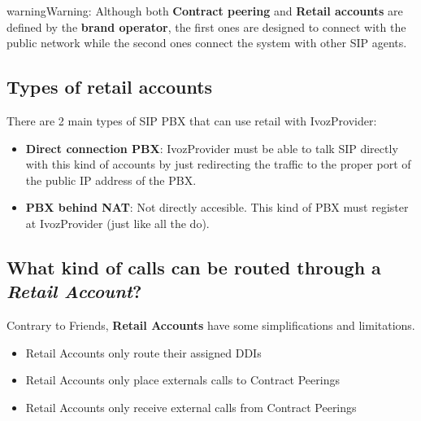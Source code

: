 \documentclass[letterpaper,10pt,english]{sphinxmanual}
\begin{document}
\begin{notice}{warning}{Warning:}
Although both \textbf{Contract peering} and \textbf{Retail accounts} are defined by the
\textbf{brand operator}, the first ones are designed to connect with the public network
while the second ones connect the system with other SIP agents.
\end{notice}


\subsection{Types of retail accounts}
\label{retail/retail_accounts:types-of-retail-accounts}
There are 2 main types of SIP PBX that can use retail with IvozProvider:
\begin{itemize}
\item {} 
\textbf{Direct connection PBX}: IvozProvider must be able to talk SIP directly with
this kind of accounts by just redirecting the traffic to the proper port of
the public IP address of the PBX.

\item {} 
\textbf{PBX behind NAT}: Not directly accesible. This kind of PBX must register at
IvozProvider (just like all the {\hyperref[pbx_features/terminals:terminals]{}} do).

\end{itemize}


\subsection{What kind of calls can be routed through a \emph{Retail Account}?}
\label{retail/retail_accounts:what-kind-of-calls-can-be-routed-through-a-retail-account}
Contrary to Friends, \textbf{Retail Accounts} have some simplifications and limitations.
\begin{itemize}
\item {} 
Retail Accounts only route their assigned DDIs

\item {} 
Retail Accounts only place externals calls to Contract Peerings

\item {} 
Retail Accounts only receive external calls from Contract Peerings

\end{itemize}
\end{document}
